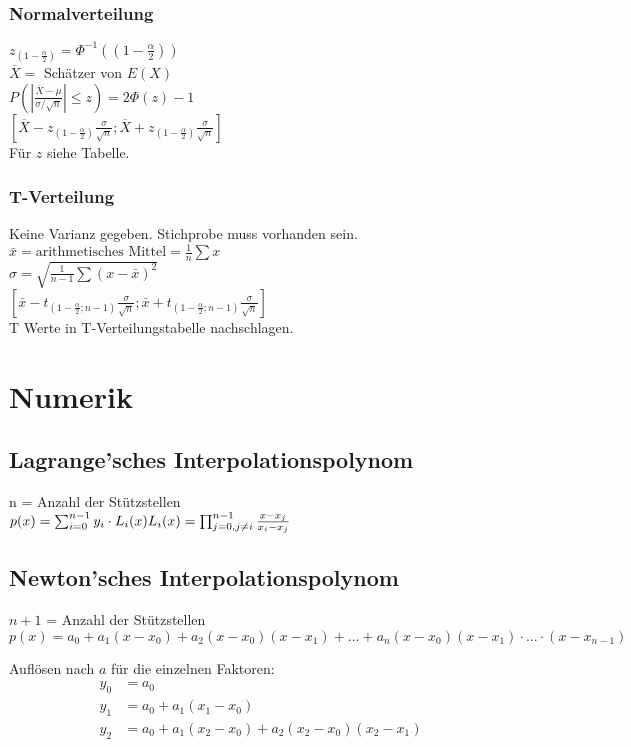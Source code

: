 \documentclass[a4paper, 8pt, landscape]{extarticle}
\let\oldsum\sum
\renewcommand{\sum}{\ensuremath{\textstyle\oldsum}}
\begin{document}
\begin{multicols*}{5}
		    	\subsubsection{Normalverteilung}
		    		$z_{(1-\frac{\alpha}{2})} = \Phi^{-1}((1-\frac{\alpha}{2}))$\\
		    		$\overline{X} = $ Schätzer von $E(X)$\\
		    		$P(|\frac{\overline{X}-\mu}{\sigma/\sqrt{n}}|\leq z)=2\Phi(z)-1$\\
				    $[\overline{X}-z_{(1-\frac{\alpha}{2})}\frac{\sigma}{\sqrt{n}};\overline{X}+z_{(1-\frac{\alpha}{2})}\frac{\sigma}{\sqrt{n}}]$\\
				    Für $z$ siehe Tabelle.
		    	\subsubsection{T-Verteilung}
			    	Keine Varianz gegeben. Stichprobe muss vorhanden sein.\\
				    $\bar{x}=\text{arithmetisches Mittel}=\frac{1}{n}\sum x$\\
				    $\sigma=\sqrt{\frac{1}{n-1}\sum(x-\bar{x})^{2}}$\\
				    $[\bar{x}-t_{(1-\frac{\alpha}{2};n-1)}\frac{\sigma}{\sqrt{n}};\bar{x}+t_{(1-\frac{\alpha}{2};n-1)}\frac{\sigma}{\sqrt{n}}]$\\
				    T Werte in T-Verteilungstabelle nachschlagen.
	\section{Numerik}
		\subsection{Lagrange'sches Interpolationspolynom}
			n = Anzahl der Stützstellen\\
			$p(x) = \sum_{i=0}^{n-1} y_i \cdot L_i(x) \\
			L_i(x) = \prod_{j = 0, j \neq i}^{n-1} \frac{x - x_j}{x_i - x_j}$
		\subsection{Newton'sches Interpolationspolynom}
			$n+1$ = Anzahl der Stützstellen\\
			$p(x) = a_0 + a_1(x - x_0) + a_2(x - x_0)(x - x_1) + ... + a_n(x-x_0)(x - x_1)\cdot ... \cdot (x - x_{n-1})$\par
			Auflösen nach $a$ für die einzelnen Faktoren:
			\begin{align*}
				y_0 &= a_0\\
				y_1 &= a_0 + a_1(x_1 - x_0)	\\
				y_2 &= a_0 + a_1(x_2 - x_0) + a_2(x_2 - x_0)(x_2 - x_1)
			\end{align*}

\end{multicols*}
\end{document}

